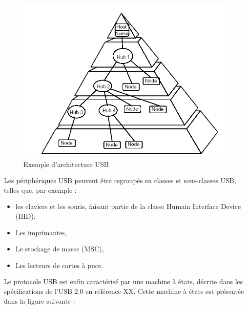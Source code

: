 \begin{figure}[!h]
\centering
\includegraphics[width=16cm]{images/schema_etoile_USB.png}
\caption{Exemple d'architecture USB}
\label{Exemple d'architecture USB}
\end{figure}

Les périphériques USB peuvent être regroupés en classes et sous-classes USB, telles que, par exemple :
\begin{itemize}
	\item les claviers et les souris, faisant partie de la classe Humain Interface Device (HID),
	\item Les imprimantes,
	\item Le stockage de masse (MSC),
	\item Les lecteurs de cartes à puce.
\end{itemize}

Le protocole USB est enfin caractérisé par une machine à états, décrite dans les spécifications de l'USB 2.0 en référence XX. Cette machine à états est présentée dans la figure suivante :

